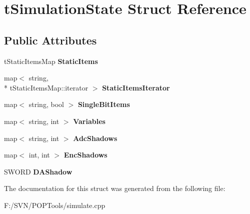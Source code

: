 \hypertarget{structt_simulation_state}{\section{t\-Simulation\-State Struct Reference}
\label{structt_simulation_state}
}
\subsection*{Public Attributes}
\begin{DoxyCompactItemize}
\item 
\hypertarget{structt_simulation_state_aa44b492057477aa6acfff025c3301c2c}{t\-Static\-Items\-Map {\bfseries Static\-Items}}\label{structt_simulation_state_aa44b492057477aa6acfff025c3301c2c}

\item 
\hypertarget{structt_simulation_state_ade9596663c13d773bede6d7d4edd314c}{map$<$ string, \\*
t\-Static\-Items\-Map\-::iterator $>$ {\bfseries Static\-Items\-Iterator}}\label{structt_simulation_state_ade9596663c13d773bede6d7d4edd314c}

\item 
\hypertarget{structt_simulation_state_a1f64e514f27859699cf4e7607c729628}{map$<$ string, bool $>$ {\bfseries Single\-Bit\-Items}}\label{structt_simulation_state_a1f64e514f27859699cf4e7607c729628}

\item 
\hypertarget{structt_simulation_state_a6354bfb53f24c5736c0a2cfa2fd5f6c4}{map$<$ string, int $>$ {\bfseries Variables}}\label{structt_simulation_state_a6354bfb53f24c5736c0a2cfa2fd5f6c4}

\item 
\hypertarget{structt_simulation_state_a7bfc568042d2b8f8c4da033351caf65a}{map$<$ string, int $>$ {\bfseries Adc\-Shadows}}\label{structt_simulation_state_a7bfc568042d2b8f8c4da033351caf65a}

\item 
\hypertarget{structt_simulation_state_afcc848f115bf5fa589a1bc11b3d9f83b}{map$<$ int, int $>$ {\bfseries Enc\-Shadows}}\label{structt_simulation_state_afcc848f115bf5fa589a1bc11b3d9f83b}

\item 
\hypertarget{structt_simulation_state_ab8310a4bf1c28a382a2444eec20ec0dd}{S\-W\-O\-R\-D {\bfseries D\-A\-Shadow}}\label{structt_simulation_state_ab8310a4bf1c28a382a2444eec20ec0dd}

\end{DoxyCompactItemize}


The documentation for this struct was generated from the following file\-:\begin{DoxyCompactItemize}
\item 
F\-:/\-S\-V\-N/\-P\-O\-P\-Tools/simulate.\-cpp\end{DoxyCompactItemize}
